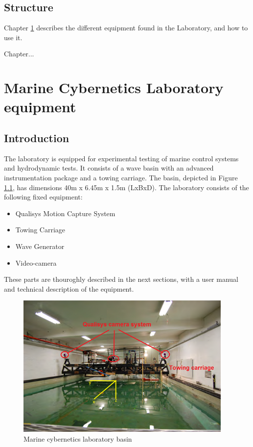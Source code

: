 \documentclass[a4paper,english]{report}
\begin{document}
\section*{Structure}
Chapter \ref{ch:marine_cybernetics_laboratory_equipment} describes the different equipment found in the Laboratory, and how to use it. 

Chapter...

\newpage{}
\tableofcontents{}
\clearpage
{}
\chapter{Marine Cybernetics Laboratory equipment}\label{ch:marine_cybernetics_laboratory_equipment}
\section{Introduction}
The laboratory is equipped for experimental testing of marine control systems and hydrodynamic tests. It consists of a wave basin with an advanced instrumentation package and a towing carriage. The basin, depicted in Figure \ref{fig: Marine cybernetics laboratory basin-1}, has dimensions 40m x 6.45m x 1.5m (LxBxD). The laboratory consists of the following fixed equipment: 
\begin{itemize}
	\item Qualisys Motion Capture System
	\item Towing Carriage
	\item Wave Generator
	\item Video-camera
\end{itemize}
These parts are thouroghly described in the next sections, with a user manual and technical description of the equipment. 

\begin{figure}[h!]
	\centering \includegraphics[width=0.95\textwidth]{fig/mc_lab} 
	\caption{Marine cybernetics laboratory basin}
	\label{fig: Marine cybernetics laboratory basin-1}
\end{figure}
\end{document}

